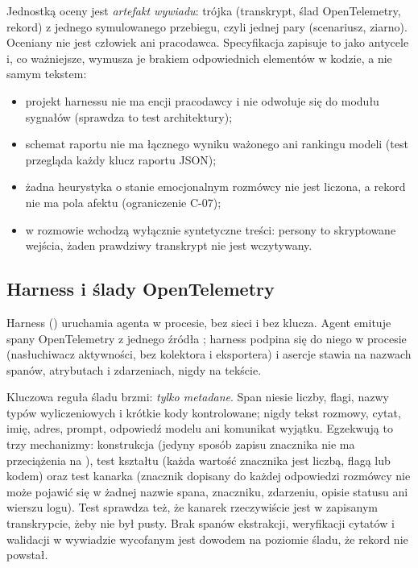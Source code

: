Jednostką oceny jest \emph{artefakt wywiadu}: trójka (transkrypt, ślad OpenTelemetry, rekord) z jednego symulowanego przebiegu, czyli jednej pary (scenariusz, ziarno). Oceniany nie jest człowiek ani pracodawca. Specyfikacja zapisuje to jako antycele i, co ważniejsze, wymusza je brakiem odpowiednich elementów w kodzie, a nie samym tekstem:

\begin{itemize}[leftmargin=*,itemsep=2pt]
  \item projekt harnessu nie ma encji pracodawcy i nie odwołuje się do modułu sygnałów (sprawdza to test architektury);
  \item schemat raportu nie ma łącznego wyniku ważonego ani rankingu modeli (test przegląda każdy klucz raportu JSON);
  \item żadna heurystyka o stanie emocjonalnym rozmówcy nie jest liczona, a rekord nie ma pola afektu (ograniczenie C-07);
  \item w rozmowie wchodzą wyłącznie syntetyczne treści: persony to skryptowane wejścia, żaden prawdziwy transkrypt nie jest wczytywany.
\end{itemize}

\subsection{Harness i ślady OpenTelemetry}

Harness () uruchamia agenta w procesie, bez sieci i bez klucza. Agent emituje spany OpenTelemetry z jednego źródła ; harness podpina się do niego w procesie (nasłuchiwacz aktywności, bez kolektora i eksportera) i asercje stawia na nazwach spanów, atrybutach i zdarzeniach, nigdy na tekście.

Kluczowa reguła śladu brzmi: \emph{tylko metadane}. Span niesie liczby, flagi, nazwy typów wyliczeniowych i krótkie kody kontrolowane; nigdy tekst rozmowy, cytat, imię, adres, prompt, odpowiedź modelu ani komunikat wyjątku. Egzekwują to trzy mechanizmy: konstrukcja (jedyny sposób zapisu znacznika nie ma przeciążenia na ), test kształtu (każda wartość znacznika jest liczbą, flagą lub kodem) oraz test kanarka (znacznik dopisany do każdej odpowiedzi rozmówcy nie może pojawić się w żadnej nazwie spana, znaczniku, zdarzeniu, opisie statusu ani wierszu logu). Test sprawdza też, że kanarek rzeczywiście jest w zapisanym transkrypcie, żeby nie był pusty. Brak spanów ekstrakcji, weryfikacji cytatów i walidacji w wywiadzie wycofanym jest dowodem na poziomie śladu, że rekord nie powstał.

